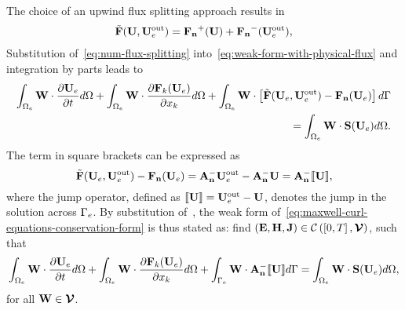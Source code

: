 The choice of an upwind flux splitting approach results in
\begin{align}
\tilde{\mathbf{F}}(\mathbf{U},\mathbf{U}_e^{\textrm{out}}) = \mathbf{\mathbf{F}_n}^+(\mathbf{U}) + \mathbf{\mathbf{F}_n}^-(\mathbf{U}_e^{\textrm{out}}),
\label{eq:num-flux-splitting}
\end{align}
Substitution of~\eqref{eq:num-flux-splitting} into~\eqref{eq:weak-form-with-physical-flux} and integration by parts leads to
\begin{align*}
\int_{\Omega_e} \mathbf{W} \cdot \frac{\partial \mathbf{U}_e}{\partial t} d\Omega  + \int_{\Omega_e} \mathbf{W} \cdot \frac{\partial \mathbf{F}_{k}(\mathbf{U}_e)}{\partial x_k} d\Omega + \int_{\Omega_e} \mathbf{W} \cdot \left[ \tilde{\mathbf{F}}(\mathbf{U}_e,\mathbf{U}_e^{\textrm{out}}) - \mathbf{\mathbf{F}_n}(\mathbf{U}_e) \right] d\Gamma \\
= \int_{\Omega_e} \mathbf{W}  \cdot \mathbf{S}(\mathbf{U}_e) d\Omega \label{eq:weak-form-upwind-splitting-fluxes}
.
\end{align*}
The term in square brackets can be expressed as
\begin{equation}
  \tilde{\mathbf{F}}(\mathbf{U}_e,\mathbf{U}_e^{\textrm{out}}) - \mathbf{\mathbf{F}_n}(\mathbf{U}_e) = \mathbf{A}_\mathbf{n}^{-} \mathbf{U}_e^{\textrm{out}} - \mathbf{A}_\mathbf{n}^{-} \mathbf{U} = \mathbf{A}_\mathbf{n}^{-} \llbracket \mathbf{U} \rrbracket, \label{eq:AnMinusUderivation}
\end{equation}
where the jump operator, defined as $\llbracket \mathbf{U} \rrbracket = \mathbf{U}_e^{\textrm{out}} - \mathbf{U}$, denotes the jump in the solution across $\Gamma_e$. By substitution of~\label{eq:AnMinusUderivation}, the weak form of~\eqref{eq:maxwell-curl-equations-conservation-form} is thus stated as:
find $\left( \mathbf{E},\mathbf{H},\mathbf{J} \right) \in \mathcal{C} \left( \left[ 0, T \right], \boldsymbol{\mathcal{V}} \right)$, such that
\begin{equation}
\int_{\Omega_e} \mathbf{W} \cdot \frac{\partial \mathbf{U}_e}{\partial t} d\Omega  + \int_{\Omega_e} \mathbf{W} \cdot \frac{\partial \mathbf{F}_{k}(\mathbf{U}_e)}{\partial x_k} d\Omega + \int_{\Gamma_e} \mathbf{W} \cdot \mathbf{A}_\mathbf{n}^{-} \llbracket \mathbf{U} \rrbracket d\Gamma = \int_{\Omega_e} \mathbf{W}  \cdot \mathbf{S}(\mathbf{U}_e) d\Omega,
\label{eq:weak-form-final}
\end{equation}
for all $\mathbf{W} \in \boldsymbol{\mathcal{V}}$.

